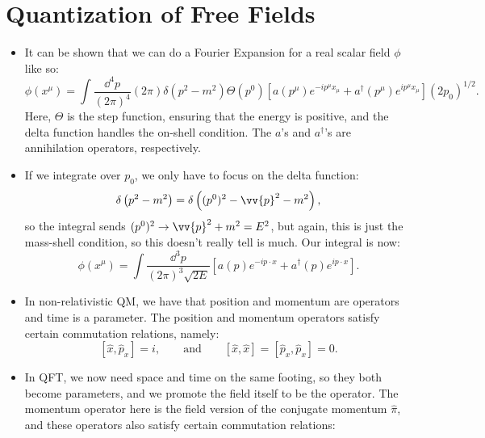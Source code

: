 \section{Quantization of Free Fields}



\begin{itemize}
    \item It can be shown that we can do a Fourier Expansion for a real scalar field $\phi$ like so:
        \begin{equation}
            \phi(x^{\mu}) = \int \frac{\dd^4p}{(2\pi)^4} (2\pi) \delta\left(p^2-m^2\right)\Theta\left(p^0\right) \left[a\left(p^{\mu}\right)e^{-ip^{\mu}x_{\mu}} + a^{\dagger}\left(p^{\mu}\right)e^{ip^{\mu}x_{\mu}}\right] (2p_0)^{1/2}.
        \end{equation}
        Here, $\Theta$ is the step function, ensuring that the energy is positive, and the delta function handles the on-shell condition. The $a$'s and $a^{\dagger}$'s are annihilation operators, respectively.
    \item If we integrate over $p_0$, we only have to focus on the delta function:
        \begin{equation*}
            \delta\left(p^2 - m^2\right) = \delta\left((p^0)^2 - \vv{p}^2 - m^2\right),
        \end{equation*}
        so the integral sends $(p^0)^2 \rightarrow \vv{p}^2 + m^2 = E^2$, but again, this is just the mass-shell condition, so this doesn't really tell is much. Our integral is now:
        \begin{equation}
            \phi(x^{\mu}) = \int \frac{\dd^3p}{(2\pi)^3 \sqrt{2E}} \left[a(p)e^{-i p\cdot x} + a^{\dagger}(p) e^{i p\cdot x}\right].
        \end{equation}
    \item In non-relativistic QM, we have that position and momentum are operators and time is a parameter. The position and momentum operators satisfy certain commutation relations, namely:
        \begin{equation}
            \left[\hat{x}, \hat{p}_x\right] = i, \qquad \text{and} \qquad \left[\hat{x},\hat{x}\right] = \left[\hat{p}_x,\hat{p}_x\right] = 0.\label{QMCommRelations}
        \end{equation}
    \item In QFT, we now need space and time on the same footing, so they both become parameters, and we promote the field itself to be the operator. The momentum operator here is the field version of the conjugate momentum $\hat{\pi}$, and these operators also satisfy certain commutation relations:

\end{itemize}
